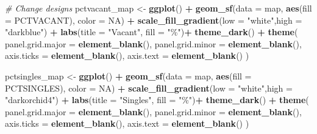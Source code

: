 \documentclass[
]{article}
\newenvironment{Shaded}{\begin{snugshade}}{\end{snugshade}}
\newcommand{\AttributeTok}[1]{\textcolor[rgb]{0.13,0.29,0.53}{#1}}
\newcommand{\CommentTok}[1]{\textcolor[rgb]{0.56,0.35,0.01}{\textit{#1}}}
\newcommand{\ConstantTok}[1]{\textcolor[rgb]{0.56,0.35,0.01}{#1}}
\newcommand{\FunctionTok}[1]{\textcolor[rgb]{0.13,0.29,0.53}{\textbf{#1}}}
\newcommand{\NormalTok}[1]{#1}
\newcommand{\OtherTok}[1]{\textcolor[rgb]{0.56,0.35,0.01}{#1}}
\newcommand{\SpecialCharTok}[1]{\textcolor[rgb]{0.81,0.36,0.00}{\textbf{#1}}}
\newcommand{\StringTok}[1]{\textcolor[rgb]{0.31,0.60,0.02}{#1}}
\begin{document}
\begin{Shaded}
\begin{Highlighting}[]
\CommentTok{\# Change designs}
\NormalTok{pctvacant\_map }\OtherTok{\textless{}{-}} \FunctionTok{ggplot}\NormalTok{() }\SpecialCharTok{+}
  \FunctionTok{geom\_sf}\NormalTok{(}\AttributeTok{data =}\NormalTok{ map, }\FunctionTok{aes}\NormalTok{(}\AttributeTok{fill =}\NormalTok{ PCTVACANT), }\AttributeTok{color =} \ConstantTok{NA}\NormalTok{) }\SpecialCharTok{+}
  \FunctionTok{scale\_fill\_gradient}\NormalTok{(}\AttributeTok{low =} \StringTok{"white"}\NormalTok{,}\AttributeTok{high =} \StringTok{"darkblue"}\NormalTok{) }\SpecialCharTok{+}
  \FunctionTok{labs}\NormalTok{(}\AttributeTok{title =} \StringTok{"Vacant"}\NormalTok{,}
       \AttributeTok{fill =} \StringTok{"\%"}\NormalTok{)}\SpecialCharTok{+}
  \FunctionTok{theme\_dark}\NormalTok{() }\SpecialCharTok{+}
  \FunctionTok{theme}\NormalTok{( }
    \AttributeTok{panel.grid.major =} \FunctionTok{element\_blank}\NormalTok{(),}
    \AttributeTok{panel.grid.minor =} \FunctionTok{element\_blank}\NormalTok{(),}
    \AttributeTok{axis.ticks =} \FunctionTok{element\_blank}\NormalTok{(),}
    \AttributeTok{axis.text =} \FunctionTok{element\_blank}\NormalTok{()}
\NormalTok{    )}

\NormalTok{pctsingles\_map }\OtherTok{\textless{}{-}} \FunctionTok{ggplot}\NormalTok{() }\SpecialCharTok{+}
  \FunctionTok{geom\_sf}\NormalTok{(}\AttributeTok{data =}\NormalTok{ map, }\FunctionTok{aes}\NormalTok{(}\AttributeTok{fill =}\NormalTok{ PCTSINGLES), }\AttributeTok{color =} \ConstantTok{NA}\NormalTok{) }\SpecialCharTok{+}
  \FunctionTok{scale\_fill\_gradient}\NormalTok{(}\AttributeTok{low =} \StringTok{"white"}\NormalTok{,}\AttributeTok{high =} \StringTok{"darkorchid4"}\NormalTok{) }\SpecialCharTok{+}
  \FunctionTok{labs}\NormalTok{(}\AttributeTok{title =} \StringTok{"Singles"}\NormalTok{,}
       \AttributeTok{fill =} \StringTok{"\%"}\NormalTok{)}\SpecialCharTok{+}
  \FunctionTok{theme\_dark}\NormalTok{() }\SpecialCharTok{+}
  \FunctionTok{theme}\NormalTok{( }
    \AttributeTok{panel.grid.major =} \FunctionTok{element\_blank}\NormalTok{(),}
    \AttributeTok{panel.grid.minor =} \FunctionTok{element\_blank}\NormalTok{(),}
    \AttributeTok{axis.ticks =} \FunctionTok{element\_blank}\NormalTok{(),}
    \AttributeTok{axis.text =} \FunctionTok{element\_blank}\NormalTok{()}
\NormalTok{    )}


\end{Highlighting}
\end{Shaded}
\end{document}
